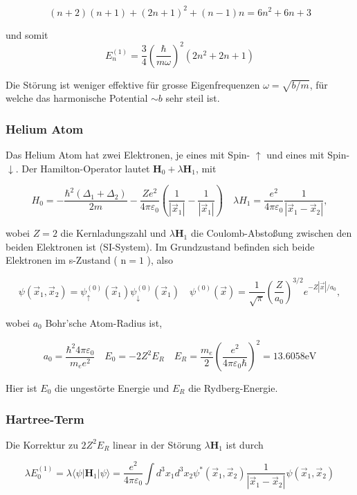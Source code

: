 \documentclass[10pt, letterpaper]{article}
\begin{document}
$$
(n+2)(n+1)+(2 n+1)^{2}+(n-1) n=6 n^{2}+6 n+3
$$

und somit
$$
E_{n}^{(1)}=\frac{3}{4}\left(\frac{\hbar}{m \omega}\right)^{2}\left(2 n^{2}+2 n+1\right)
$$

Die Störung ist weniger effektive für grosse Eigenfrequenzen $\omega=\sqrt{b / m}$, für welche das harmonische Potential $\sim b$ sehr steil ist.

\subsubsection*{Helium Atom}
Das Helium Atom hat zwei Elektronen, je eines mit Spin- $\uparrow$ und eines mit Spin- $\downarrow$. Der Hamilton-Operator lautet $\mathbf{H}_{0}+\lambda \mathbf{H}_{1}$, mit

$$
H_{0}=-\frac{\hbar^{2}\left(\Delta_{1}+\Delta_{2}\right)}{2 m}-\frac{Z e^{2}}{4 \pi \varepsilon_{0}}\left(\frac{1}{\left|\vec{x}_{1}\right|}-\frac{1}{\left|\vec{x}_{1}\right|}\right) \quad \lambda H_{1}=\frac{e^{2}}{4 \pi \varepsilon_{0}} \frac{1}{\left|\vec{x}_{1}-\vec{x}_{2}\right|},
$$

wobei $Z=2$ die Kernladungszahl und $\lambda \mathbf{H}_{1}$ die Coulomb-Abstoßung zwischen den beiden Elektronen ist (SI-System). Im Grundzustand befinden sich beide Elektronen im s-Zustand ( $\mathrm{n}=1$ ), also

$$
\psi\left(\vec{x}_{1}, \vec{x}_{2}\right)=\psi_{\uparrow}^{(0)}\left(\vec{x}_{1}\right) \psi_{\downarrow}^{(0)}\left(\vec{x}_{1}\right) \quad \psi^{(0)}(\vec{x})=\frac{1}{\sqrt{\pi}}\left(\frac{Z}{a_{0}}\right)^{3 / 2} e^{-Z|\vec{x}| / a_{0}},
$$

wobei $a_{0}$ Bohr'sche Atom-Radius ist,

$$
a_{0}=\frac{\hbar^{2} 4 \pi \varepsilon_{0}}{m_{e} e^{2}} \quad E_{0}=-2 Z^{2} E_{R} \quad E_{R}=\frac{m_{e}}{2}\left(\frac{e^{2}}{4 \pi \varepsilon_{0} \hbar}\right)^{2}=13.6058 \mathrm{eV}
$$

Hier ist $E_{0}$ die ungestörte Energie und $E_{R}$ die Rydberg-Energie.

\subsubsection*{Hartree-Term}
Die Korrektur zu $2 Z^{2} E_{R}$ linear in der Störung $\lambda \mathbf{H}_{1}$ ist durch

$$
\lambda E_{0}^{(1)}=\lambda\langle\psi| \mathbf{H}_{1}|\psi\rangle=\frac{e^{2}}{4 \pi \varepsilon_{0}} \int d^{3} x_{1} d^{3} x_{2} \psi^{*}\left(\vec{x}_{1}, \vec{x}_{2}\right) \frac{1}{\left|\vec{x}_{1}-\vec{x}_{2}\right|} \psi\left(\vec{x}_{1}, \vec{x}_{2}\right)
$$
\end{document}
